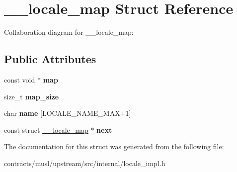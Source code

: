 \hypertarget{struct____locale__map}{}\section{\+\_\+\+\_\+locale\+\_\+map Struct Reference}
\label{struct____locale__map}


Collaboration diagram for \+\_\+\+\_\+locale\+\_\+map\+:
\subsection*{Public Attributes}
\begin{DoxyCompactItemize}
\item 
\mbox{\label{struct____locale__map_a4c9e86604c08e5346c13c9778fba86a0}} 
const void $\ast$ {\bfseries map}
\item 
\mbox{\label{struct____locale__map_a0aa04e3fca334c50bb0f72adf704942d}} 
size\+\_\+t {\bfseries map\+\_\+size}
\item 
\mbox{\label{struct____locale__map_a431f57ca51f6ebc33f3fddb45331893b}} 
char {\bfseries name} \mbox{[}L\+O\+C\+A\+L\+E\+\_\+\+N\+A\+M\+E\+\_\+\+M\+AX+1\mbox{]}
\item 
\mbox{\label{struct____locale__map_ad73f36d6b8cc3145bcc4177678b75686}} 
const struct \mbox{\hyperlink{struct____locale__map}{\+\_\+\+\_\+locale\+\_\+map}} $\ast$ {\bfseries next}
\end{DoxyCompactItemize}


The documentation for this struct was generated from the following file\+:\begin{DoxyCompactItemize}
\item 
contracts/musl/upstream/src/internal/locale\+\_\+impl.\+h\end{DoxyCompactItemize}
